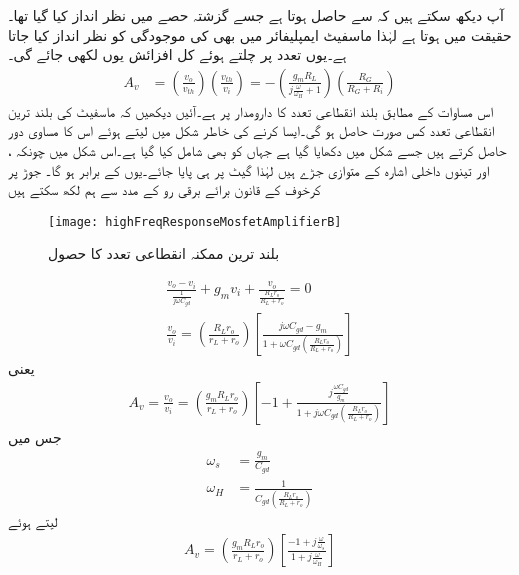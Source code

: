 آپ دیکھ سکتے ہیں کہ  سے  حاصل ہوتا ہے جسے گزشتہ حصے میں نظر انداز کیا گیا تھا۔حقیقت میں  ہوتا ہے لہٰذا ماسفیٹ      ایمپلیفائر میں بھی  کی موجودگی کو نظر انداز کیا جاتا ہے۔یوں  تعدد پر چلتے ہوئے کل افزائش یوں لکھی جائے گی۔
\begin{align}
A_v&=\left(\frac{v_o}{v_{th}} \right) \left( \frac{v_{th}}{v_i}\right)=-\left(\frac{g_m R_L}{j \frac{\omega}{\omega_H} +1} \right) \left(\frac{R_G}{R_G+R_i} \right)
\end{align}
اس مساوات کے مطابق بلند انقطاعی تعدد کا دارومدار  پر ہے۔آئیں دیکھیں کہ ماسفیٹ کی بلند ترین انقطاعی تعدد کس صورت حاصل ہو گی۔ایسا کرنے کی خاطر شکل  میں  لیتے  ہوئے اس کا مساوی دور حاصل کرتے ہیں جسے شکل  میں دکھایا گیا ہے جہاں  کو بھی شامل کیا گیا ہے۔اس شکل میں چونکہ ،  اور  تینوں داخلی اشارہ  کے متوازی جڑے ہیں لہٰذا گیٹ پر  ہی پایا جائے۔یوں  کے برابر ہو گا۔  جوڑ پر کرخوف کے قانون برائے برقی رو کے مدد سے ہم لکھ سکتے ہیں
\begin{figure}
\centering
\texttt{[image: highFreqResponseMosfetAmplifierB]}
\caption{بلند ترین ممکنہ انقطاعی تعدد کا حصول}
\label{شکل_تعددی_ردعمل_ماسفیٹ_بلند_ترین_انقطاعی}
\end{figure}
%
\begin{align*}
\frac{v_o-v_i}{\frac{1}{j \omega C_{gd}}}+g_m v_i+\frac{v_o}{\frac{R_L r_o}{R_L+r_o}}=0\\
\frac{v_o}{v_i}=\left(\frac{R_L r_o}{r_L+r_o} \right)\left[\frac{j \omega C_{gd}-g_m}{1+\omega C_{gd} \left(\frac{R_L r_o}{R_L+r_o} \right)} \right]
\end{align*}
یعنی
\begin{align}
A_v=\frac{v_o}{v_i}=\left(\frac{g_m R_L r_o}{r_L+r_o} \right)\left[-1+\frac{j \frac{\omega C_{gd}}{g_m}}{1+j\omega C_{gd} \left(\frac{R_L r_o}{R_L+r_o} \right)} \right]
\end{align}
جس میں
\begin{align}
\omega_s&=\frac{g_m}{C_{gd}}\\
\omega_H&=\frac{1}{C_{gd} \left(\frac{R_L r_o}{R_L+r_o} \right)}
\end{align}
لیتے ہوئے
\begin{align} \label{مساوات_تعددی_ردعمل_مشترکہ_مخارج_ماسفیٹ_ایمپلیفائر_افزائش}
A_v=\left(\frac{g_m R_L r_o}{r_L+r_o} \right)\left[\frac{-1+j \frac{\omega}{\omega_s}}{1+j \frac{\omega}{\omega_H}} \right]
\end{align}
